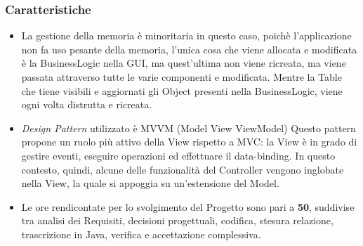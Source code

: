 \documentclass[10pt]{beamer}
\begin{document}
\begin{frame}
\frametitle{Caratteristiche}
\begin{itemize}
\item La gestione della memoria è minoritaria in questo caso, poichè l'applicazione non fa uso pesante della memoria, l'unica cosa che viene allocata e modificata è la BusinessLogic nella GUI, ma quest'ultima non viene ricreata, ma viene passata attraverso tutte le varie componenti e modificata.
Mentre la Table che tiene visibili e aggiornati gli Object presenti nella BusinessLogic, viene ogni volta distrutta e ricreata.

\item \textit{Design Pattern} utilizzato è MVVM (Model View ViewModel) Questo pattern propone un ruolo più attivo della View rispetto a MVC: la View è in grado di gestire eventi, eseguire operazioni ed effettuare il data-binding. In questo contesto, quindi, alcune delle funzionalità del Controller vengono inglobate nella View, la quale si appoggia su un’estensione del Model.

\item Le ore rendicontate per lo svolgimento del Progetto sono pari a \textbf{50}, suddivise tra analisi dei Requisiti, decisioni progettuali, codifica, stesura relazione, trascrizione in Java, verifica e accettazione complessiva.
\end{itemize}
\end{frame}



\end{document}
